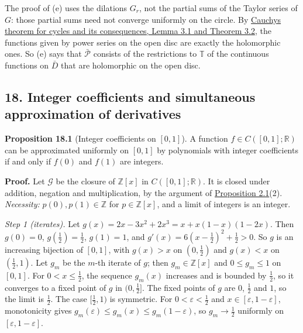 \documentclass[
  english,
  11pt,
  a4paper,
]{article}
\begin{document}
The proof of (e) uses the dilations \(G_r\), not the partial sums of the
Taylor series of \(G\): those partial sums need not converge uniformly
on the circle. By
\href{https://kokunoyumeto.github.io/open-math-courses/courses/harmonic-analysis-on-locally-compact-groups/reader/programme-reading.html\#ref-7265a5ab9053615e}{Cauchy\textquotesingle s
theorem for cycles and its consequences, Lemma 3.1 and Theorem 3.2}, the
functions given by power series on the open disc are exactly the
holomorphic ones. So (e) says that \(\bar{\mathcal P}\) consists of the
restrictions to \(\mathbb T\) of the continuous functions on \(\bar D\)
that are holomorphic on the open disc.

\subsection[18. Integer coefficients and simultaneous approximation of
derivatives]{\texorpdfstring{\protect\hypertarget{the-stone-weierstrass-theorem-for-functions-vanishing-at-infinity--oa-fnd-sw-20}{}{}18.
Integer coefficients and simultaneous approximation of
derivatives}{18. Integer coefficients and simultaneous approximation of derivatives}}\label{the-stone-weierstrass-theorem-for-functions-vanishing-at-infinity--OA-FND-SW-20}

\textbf{Proposition 18.1} (Integer coefficients on \([0,1]\)). A
function \(f\in C([0,1];\mathbb R)\) can be approximated uniformly on
\([0,1]\) by polynomials with integer coefficients if and only if
\(f(0)\) and \(f(1)\) are integers.

\textbf{Proof.} Let \(\mathcal G\) be the closure of \(\mathbb Z[x]\) in
\(C([0,1];\mathbb R)\). It is closed under addition, negation and
multiplication, by the argument of
\hyperlink{the-stone-weierstrass-theorem-for-functions-vanishing-at-infinity--oa-fnd-sw-01}{Proposition
2.1}(2). \emph{Necessity:} \(p(0),p(1)\in\mathbb Z\) for
\(p\in\mathbb Z[x]\), and a limit of integers is an integer.

\emph{Step 1 (iterates).} Let \(g(x)=2x-3x^2+2x^3=x+x(1-x)(1-2x)\). Then
\(g(0)=0\), \(g(\frac12)=\frac12\), \(g(1)=1\), and
\(g'(x)=6(x-\frac12)^2+\frac12>0\). So \(g\) is an increasing bijection
of \([0,1]\), with \(g(x)>x\) on \((0,\frac12)\) and \(g(x)<x\) on
\((\frac12,1)\). Let \(g_m\) be the \(m\)-th iterate of \(g\); then
\(g_m\in\mathbb Z[x]\) and \(0\leq g_m\leq1\) on \([0,1]\). For
\(0<x\leq\frac12\), the sequence \(g_m(x)\) increases and is bounded by
\(\frac12\), so it converges to a fixed point of \(g\) in
\((0,\frac12]\). The fixed points of \(g\) are \(0\), \(\frac12\) and
\(1\), so the limit is \(\frac12\). The case \([\frac12,1)\) is
symmetric. For \(0<\varepsilon<\frac12\) and
\(x\in[\varepsilon,1-\varepsilon]\), monotonicity gives
\(g_m(\varepsilon)\leq g_m(x)\leq g_m(1-\varepsilon)\), so
\(g_m\to\frac12\) uniformly on \([\varepsilon,1-\varepsilon]\).
\end{document}

